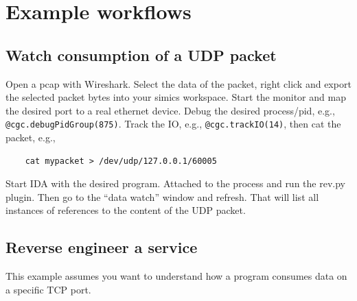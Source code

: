 \documentclass[titlepage]{article}
\begin{document}
\section{Example workflows}
\label{example-workflows}
\subsection{Watch consumption of a UDP packet}
Open a pcap with Wireshark. Select the data of the packet, right click and export the selected packet bytes into your simics workspace.
Start the monitor and map the desired port to a real ethernet device.
Debug the desired process/pid, e.g., {\tt @cgc.debugPidGroup(875)}.  Track the IO, e.g., {\tt @cgc.trackIO(14)},
then cat the packet, e.g.,
\begin{verbatim}
    cat mypacket > /dev/udp/127.0.0.1/60005
\end{verbatim}

Start IDA with the desired program.  Attached to the process and run the rev.py plugin.  Then go to the ``data watch'' window and
refresh.  That will list all instances of references to the content of the UDP packet. 

\subsection{Reverse engineer a service}
This example assumes you want to understand how a program consumes
data on a specific TCP port.
\end{document}
